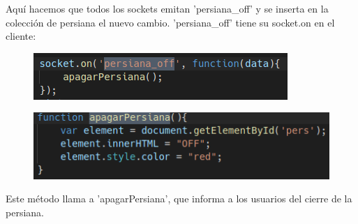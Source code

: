 \documentclass{article}
\begin{document}
	Aquí hacemos que todos los sockets emitan 'persiana\_off' y se inserta en la colección de persiana el nuevo cambio. 'persiana\_off' tiene su socket.on en el cliente:
	\begin{figure}[H]
		\centering
		\includegraphics[totalheight=1.85cm]{img/37.png}
	\end{figure}
	\begin{figure}[H]
		\centering
		\includegraphics[totalheight=3cm]{img/38.png}
	\end{figure}
	Este método llama a 'apagarPersiana', que informa a los usuarios del cierre de la persiana.
\end{document}
